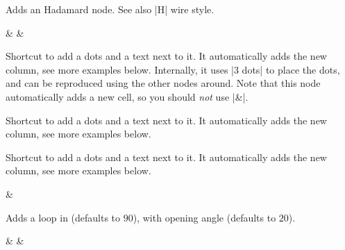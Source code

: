 \documentclass[a4paper]{ltxdoc}
\begin{document}
{\begin{command}{\zxH{}}
  Adds an Hadamard node. See also |H| wire style.
\begin{codeexample}[width=3cm]
\begin{ZX}
  \zxNone{} \rar & \zxH{} \rar & \zxNone{}
\end{ZX}
\end{codeexample}
\end{command}



\begin{command}{\leftManyDots{}}
  Shortcut to add a dots and a text next to it. It automatically adds the new column, see more examples below. Internally, it uses |3 dots| to place the dots, and can be reproduced using the other nodes around. Note that this node automatically adds a new cell, so you should \emph{not} use |&|.
\begin{codeexample}[]
\begin{ZX}
   \zxX{\alpha}
\end{ZX}
\end{codeexample}
\end{command}

\begin{command}{\leftManyDots{}}
  Shortcut to add a dots and a text next to it. It automatically adds the new column, see more examples below.
\begin{codeexample}[width=3cm]
\begin{ZX}
  \zxX{\alpha} 
\end{ZX}
\end{codeexample}
\end{command}

\begin{command}{\middleManyDots{}}
  Shortcut to add a dots and a text next to it. It automatically adds the new column, see more examples below.
\begin{codeexample}[width=3cm]
\begin{ZX}
  \zxX{\alpha} \middleManyDots{} & \zxX{\beta}
\end{ZX}
\end{codeexample}
\end{command}

\begin{command}{\zxLoop{}}
  Adds a loop in  (defaults to $90$), with opening angle  (defaults to $20$).
\begin{codeexample}[width=3cm]
\begin{ZX}
  \zxX{\alpha} \zxLoop{} & \zxX{} \zxLoop[45]{} & \zxX{} \zxLoop[0][30][red]{}
\end{ZX}
\end{codeexample}
\end{command}

}
\end{document}
